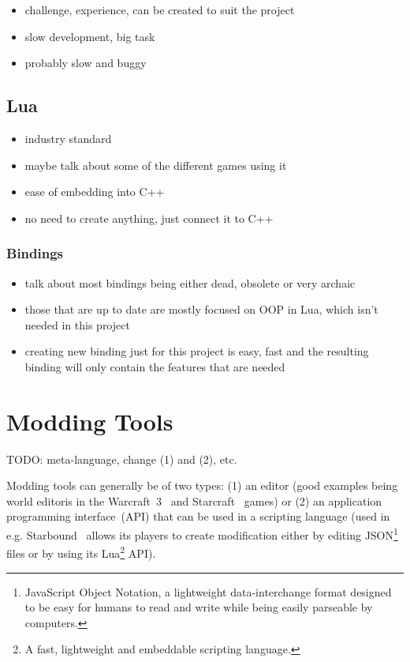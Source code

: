 \begin{itemize}
    \item challenge, experience, can be created to suit the project
    \item slow development, big task
    \item probably slow and buggy
\end{itemize}

\subsection{Lua}

\begin{itemize}
    \item industry standard
    \item maybe talk about some of the different games using it
    \item ease of embedding into C++
    \item no need to create anything, just connect it to C++
\end{itemize}

\subsubsection{Bindings}

\begin{itemize}
    \item talk about most bindings being either dead, obsolete or very
        archaic
    \item those that are up to date are mostly focused on OOP in Lua,
        which isn't needed in this project
    \item creating new binding just for this project is easy, fast and
        the resulting binding will only contain the features that are needed
\end{itemize}

\section{Modding Tools}

TODO: meta-language, change (1) and (2), etc.

Modding tools can generally be of two types: (1) an editor (good examples being world editoris in the Warcraft~3~\cite{WC3} and
Starcraft~\cite{SC} games) or (2) an application programming interface~(API) that can be used in a scripting language 
(used in e.g. Starbound~\cite{Starbound} allows its players to create modification either by editing 
JSON\footnote{JavaScript Object Notation, a lightweight data-interchange
format designed to be easy for humans to read and write while being easily parseable by computers.\cite{JSON}} files or by using its
Lua\footnote{A fast, lightweight and embeddable scripting language.\cite{Lua}} API).

